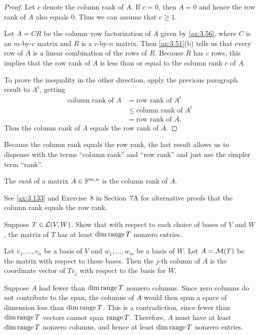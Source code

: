 \begin{proof}
Let $c$ denote the column rank of $A$. If $c=0$, then $A=0$ and hence the row
rank of $A$ also equals $0$. Thus we can assume that $c\ge1$.

Let $A=CR$ be the column--row factorization of $A$ given by \ref{ax:3.56},
where $C$ is an $m$-by-$c$ matrix and $R$ is a $c$-by-$n$ matrix. Then
\ref{ax:3.51}(b) tells us that every row of $A$ is a linear combination of the
rows of $R$. Because $R$ has $c$ rows, this implies that the row rank of $A$ is
less than or equal to the column rank $c$ of $A$.

To prove the inequality in the other direction, apply the previous paragraph
result to $A^{\mathrm{t}}$, getting
\begin{align*}
\text{column rank of } A &= \text{row rank of } A^{\mathrm{t}}\\
  &\le \text{column rank of } A^{\mathrm{t}}\\
  &= \text{row rank of } A.
\end{align*}
Thus the column rank of $A$ equals the row rank of $A$.
\end{proof}

Because the column rank equals the row rank, the last result allows us to
dispense with the terms ``column rank'' and ``row rank'' and just use the
simpler term ``rank''.

\begin{definition}[Rank]\label{ax:3.58}
The \emph{rank} of a matrix $A\in\mathbb{F}^{m,n}$ is the column rank of $A$.
\end{definition}

See \ref{ax:3.133} and Exercise~8 in Section~7A for alternative proofs that the
column rank equals the row rank.


\begin{exercise}
Suppose $T\in\mathcal{L}(V,W)$. Show that with respect to each choice of bases of $V$
and $W$, the matrix of $T$ has at least $\operatorname{dim}\operatorname{range} T$ nonzero entries.
\end{exercise}
\begin{solution}
Let $v_1,\dots,v_n$ be a basis of $V$ and $w_1,\dots,w_m$ be a basis of $W$.
Let $A=\mathcal{M}(T)$ be the matrix with respect to these bases. Then the $j$-th
column of $A$ is the coordinate vector of $Tv_j$ with respect to the basis for
$W$.

Suppose $A$ had fewer than $\operatorname{dim}\operatorname{range} T$ nonzero columns. Since zero columns
do not contribute to the span, the columns of $A$ would then span a space of
dimension less than $\operatorname{dim}\operatorname{range} T$. This is a contradiction, since fewer than
$\operatorname{dim}\operatorname{range} T$ vectors cannot span $\operatorname{range} T$. Therefore, $A$ must have at
least $\operatorname{dim}\operatorname{range} T$ nonzero columns, and hence at least $\operatorname{dim}\operatorname{range} T$ nonzero
entries.
\end{solution}

